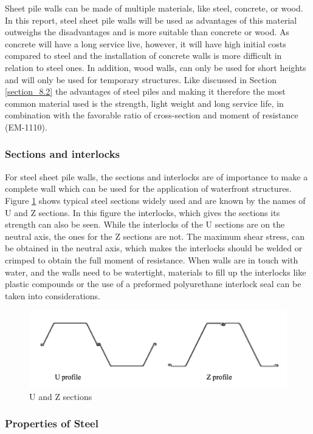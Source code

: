 Sheet pile walls can be made of multiple materials, like steel, concrete, or wood. In this report, steel sheet pile walls will be used as advantages of this material outweighs the disadvantages and is more suitable than concrete or wood. As concrete will have a long service live, however, it will have high initial costs compared to steel and the installation of concrete walls is more difficult in relation to steel ones. In addition, wood walls, can only be used for short heights and will only be used for temporary structures. Like discussed in Section \ref{section_8.2} the advantages of steel piles and making it therefore the most common material used is the strength, light weight and long service life, in combination with the favorable ratio of cross-section and moment of resistance (EM-1110).

\subsubsection{Sections and interlocks}

For steel sheet pile walls, the sections and interlocks are of importance to make a complete wall which can be used for the application of waterfront structures. Figure \ref{fig:sections_sheetpiles} shows typical steel sections widely used and are known by the names of U and Z sections. In this figure the interlocks, which gives the sections its strength can also be seen. While the interlocks of the U sections are on the neutral axis, the ones for the Z sections are not. The maximum shear stress, can be obtained in the neutral axis, which makes the interlocks should be welded or crimped to obtain the full moment of resistance. When walls are in touch with water, and the walls need to be watertight, materials to fill up the interlocks like plastic compounds or the use of a preformed polyurethane interlock seal can be taken into considerations. 

\begin{figure}[H]
    \centering
    \includegraphics[width=0.50\linewidth]{figures/ch8/u_profile_z_profile.png}
    \caption{U and Z sections}
    \label{fig:sections_sheetpiles}
\end{figure}

\subsubsection{Properties of Steel}

